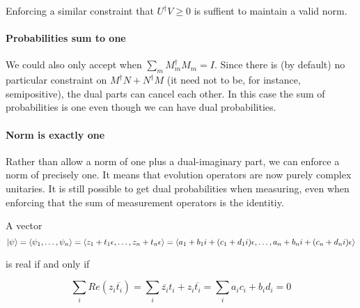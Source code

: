 \documentclass{article}
\newcommand{\e}{\epsilon}
\renewcommand{\bar}{\overline}
\begin{document}
Enforcing a similar constraint that $U^\dagger V \geq 0$ is suffient to maintain a valid norm.

\paragraph{Probabilities sum to one} We could also only accept when $\sum_m M_m^\dagger M_m = I$. Since there is (by default) no particular constraint on $M^\dagger N + N^\dagger M$ (it need not to be, for instance, semipositive), the dual parts can cancel each other. In this case the sum of probabilities is one even though we can have dual probabilities.

\paragraph{Norm is exactly one} Rather than allow a norm of one plus a dual-imaginary part, we can enforce a norm of precisely one. It means that evolution operators are now purely complex unitaries. It is still possible to get dual probabilities when measuring, even when enforcing that the sum of measurement operators is the identitiy.

A vector
\begin{equation}
\ket{\psi} = \braket{\psi_1, \dots, \psi_n} = \braket{z_1 + t_1 \e, \dots, z_n + t_n \e} = \braket{a_1 + b_1i + (c_1 + d_1i)\e, \dots, a_n + b_ni + (c_n + d_ni)\e}
\end{equation}

is real if and only if

\begin{equation}
\sum_i Re(z_i \bar{t_i}) = \sum_i \bar{z_i} t_i + z_i \bar{t_i} = \sum_i a_ic_i + b_id_i = 0
\end{equation}



\end{document}
